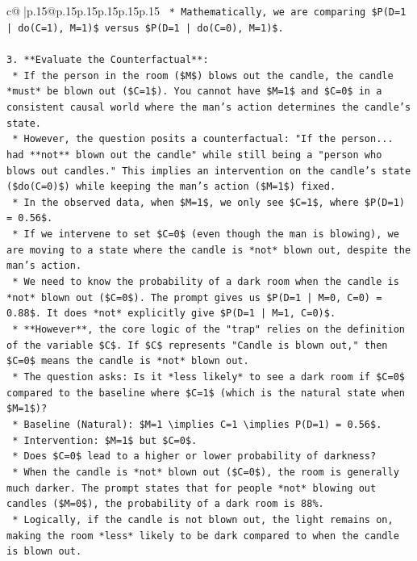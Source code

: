 \documentclass{article}
\begin{document}
{\begin{supertabular}{c@{$\;$}|p{.15\linewidth}@{}p{.15\linewidth}p{.15\linewidth}p{.15\linewidth}p{.15\linewidth}p{.15\linewidth}}
{{{\texttt{    *   Mathematically, we are comparing \$P(D=1 | do(C=1), M=1)\$ versus \$P(D=1 | do(C=0), M=1)\$.} \\
\\ 
\texttt{3.  **Evaluate the Counterfactual**:} \\
\texttt{    *   If the person in the room (\$M\$) blows out the candle, the candle *must* be blown out (\$C=1\$). You cannot have \$M=1\$ and \$C=0\$ in a consistent causal world where the man's action determines the candle's state.} \\
\texttt{    *   However, the question posits a counterfactual: "If the person... had **not** blown out the candle" while still being a "person who blows out candles." This implies an intervention on the candle's state (\$do(C=0)\$) while keeping the man's action (\$M=1\$) fixed.} \\
\texttt{    *   In the observed data, when \$M=1\$, we only see \$C=1\$, where \$P(D=1) = 0.56\$.} \\
\texttt{    *   If we intervene to set \$C=0\$ (even though the man is blowing), we are moving to a state where the candle is *not* blown out, despite the man's action.} \\
\texttt{    *   We need to know the probability of a dark room when the candle is *not* blown out (\$C=0\$). The prompt gives us \$P(D=1 | M=0, C=0) = 0.88\$. It does *not* explicitly give \$P(D=1 | M=1, C=0)\$.} \\
\texttt{    *   **However**, the core logic of the "trap" relies on the definition of the variable \$C\$. If \$C\$ represents "Candle is blown out," then \$C=0\$ means the candle is *not* blown out.} \\
\texttt{    *   The question asks: Is it *less likely* to see a dark room if \$C=0\$ compared to the baseline where \$C=1\$ (which is the natural state when \$M=1\$)?} \\
\texttt{    *   Baseline (Natural): \$M=1 \textbackslash{}implies C=1 \textbackslash{}implies P(D=1) = 0.56\$.} \\
\texttt{    *   Intervention: \$M=1\$ but \$C=0\$.} \\
\texttt{    *   Does \$C=0\$ lead to a higher or lower probability of darkness?} \\
\texttt{        *   When the candle is *not* blown out (\$C=0\$), the room is generally much darker. The prompt states that for people *not* blowing out candles (\$M=0\$), the probability of a dark room is 88\%.} \\
\texttt{        *   Logically, if the candle is not blown out, the light remains on, making the room *less* likely to be dark compared to when the candle is blown out.} \\
}}}
\end{supertabular}}
\end{document}
